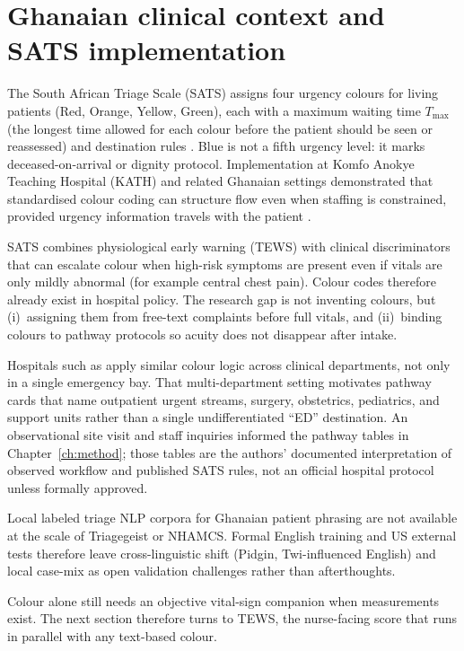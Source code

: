 \section[Ghanaian clinical context and SATS implementation]{Ghanaian clinical context and\\ SATS implementation}
\label{sec:ghana-sats}

The South African Triage Scale (SATS) assigns four urgency colours for living patients (Red, Orange, Yellow, Green), each with a maximum waiting time \(T_{\max}\) (the longest time allowed for each colour before the patient should be seen or reassessed) and destination rules \citep{satsmanual}. Blue is not a fifth urgency level: it marks deceased-on-arrival or dignity protocol. Implementation at Komfo Anokye Teaching Hospital (KATH) and related Ghanaian settings demonstrated that standardised colour coding can structure flow even when staffing is constrained, provided urgency information travels with the patient \citep{Rominski2014,kathsats}.

SATS combines physiological early warning (TEWS) with clinical discriminators that can escalate colour when high-risk symptoms are present even if vitals are only mildly abnormal (for example central chest pain). Colour codes therefore already exist in hospital policy. The research gap is not inventing colours, but (i)~assigning them from free-text complaints before full vitals, and (ii)~binding colours to pathway protocols so acuity does not disappear after intake.

Hospitals such as \examplehospital{} apply similar colour logic across clinical departments, not only in a single emergency bay. That multi-department setting motivates pathway cards that name outpatient urgent streams, surgery, obstetrics, pediatrics, and support units rather than a single undifferentiated ``ED'' destination. An observational site visit and staff inquiries informed the pathway tables in Chapter~\ref{ch:method}; those tables are the authors' documented interpretation of observed workflow and published SATS rules, not an official hospital protocol unless formally approved.

Local labeled triage NLP corpora for Ghanaian patient phrasing are not available at the scale of Triagegeist or NHAMCS. Formal English training and US external tests therefore leave cross-linguistic shift (Pidgin, Twi-influenced English) and local case-mix as open validation challenges rather than afterthoughts.

Colour alone still needs an objective vital-sign companion when measurements exist. The next section therefore turns to TEWS, the nurse-facing score that runs in parallel with any text-based colour.


